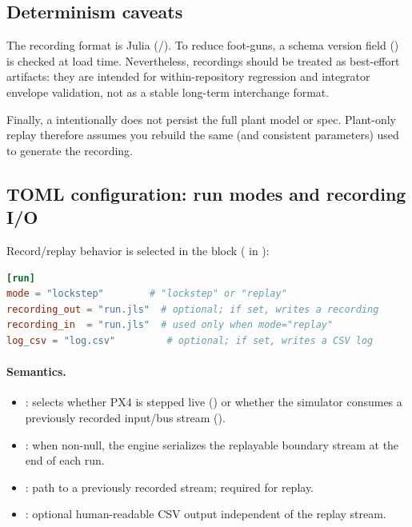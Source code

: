 \subsection{Determinism caveats}

The recording format is Julia  (/). To reduce foot-guns, a schema version field () is checked at load time. Nevertheless, recordings should be treated as best-effort artifacts: they are intended for within-repository regression and integrator envelope validation, not as a stable long-term interchange format.

Finally, a  intentionally does not persist the full plant model or spec. Plant-only replay therefore assumes you rebuild the same  (and consistent parameters) used to generate the recording.


\subsection{TOML configuration: run modes and recording I/O}
\label{sec:run-toml}

Record/replay behavior is selected in the \code{[run]} block ( in ):

\begin{lstlisting}[language=toml]
[run]
mode = "lockstep"        # "lockstep" or "replay"
recording_out = "run.jls"  # optional; if set, writes a recording
recording_in  = "run.jls"  # used only when mode="replay"
log_csv = "log.csv"         # optional; if set, writes a CSV log
\end{lstlisting}

\paragraph{Semantics.}
\begin{itemize}[leftmargin=*,itemsep=2pt]
  \item {}: selects whether PX4 is stepped live () or whether the simulator consumes a previously recorded input/bus stream ().
  \item {}: when non-null, the engine serializes the replayable boundary stream at the end of each run.
  \item {}: path to a previously recorded stream; required for replay.
  \item {}: optional human-readable CSV output independent of the replay stream.
\end{itemize}
